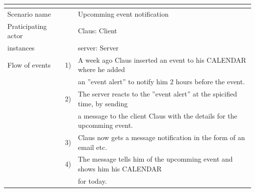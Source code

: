 \documentclass[a4paper]{article}
\begin{document}
\begin{tabular}{l r @{} l}
	\multicolumn{2}{c}{} \\
	\hline
	Scenario name	&&Upcomming event notification\\
	\hline
	Praticipating actor	&&Claus: Client \\
	instances       	&&server: Server\\
	\hline
	Flow of events	&1)&A week ago Claus inserted an event to his CALENDAR where he added\\ 
					&&an ''event alert'' to notify him 2 hours before the event.\\
				&2)&The server reacts to the ''event alert'' at the spicified time, by sending\\
					&&a message to the client Claus with the details for the upcomming event.\\
				&3)&Claus now gets a message notification in the form of an email etc.\\ 
				&4)&The message tells him of the upcomming event and shows him his CALENDAR\\
					&&for today.\\
	\hline
\end{tabular}
\end{document}
